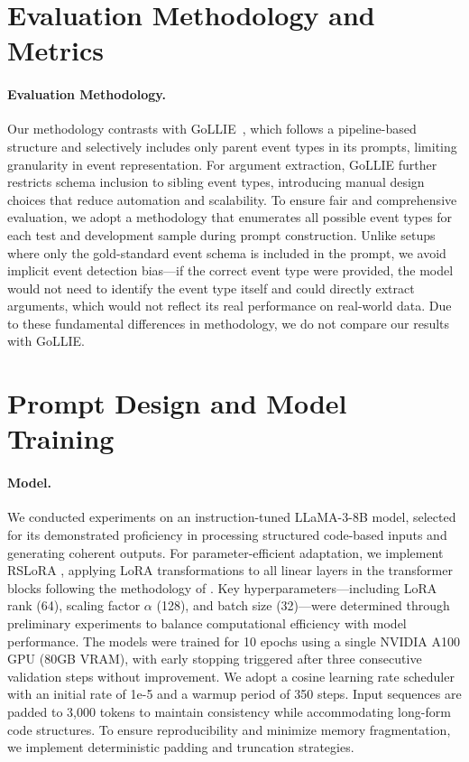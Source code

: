\section{Evaluation Methodology and Metrics}
\label{sec:app_additional_details}
\paragraph{Evaluation Methodology.} 
Our methodology contrasts with GoLLIE~\cite{sainz2024gollie}, which follows a pipeline-based structure and selectively includes only parent event types in its prompts, limiting granularity in event representation. For argument extraction, GoLLIE further restricts schema inclusion to sibling event types, introducing manual design choices that reduce automation and scalability. To ensure fair and comprehensive evaluation, we adopt a methodology that enumerates all possible event types for each test and development sample during prompt construction. Unlike setups where only the gold-standard event schema is included in the prompt, we avoid implicit event detection bias—if the correct event type were provided, the model would not need to identify the event type itself and could directly extract arguments, which would not reflect its real performance on real-world data. Due to these fundamental differences in methodology, we do not compare our results with GoLLIE.


\section{Prompt Design and Model Training}
\paragraph{Model.} 
We conducted experiments on an instruction-tuned LLaMA-3-8B model, selected for its demonstrated proficiency in processing structured code-based inputs and generating coherent outputs. For parameter-efficient adaptation, we implement RSLoRA \cite{kalajdzievski2023rankstabilizationscalingfactor}, applying LoRA transformations to all linear layers in the transformer blocks following the methodology of \citet{dettmers2024qlora}. Key hyperparameters—including LoRA rank (64), scaling factor $\alpha$ (128), and batch size (32)—were determined through preliminary experiments to balance computational efficiency with model performance. The models were trained for 10 epochs using a single NVIDIA A100 GPU (80GB VRAM), with early stopping triggered after three consecutive validation steps without improvement. We adopt a cosine learning rate scheduler with an initial rate of 1e-5 and a warmup period of 350 steps. Input sequences are padded to 3,000 tokens to maintain consistency while accommodating long-form code structures. To ensure reproducibility and minimize memory fragmentation, we implement deterministic padding and truncation strategies.

